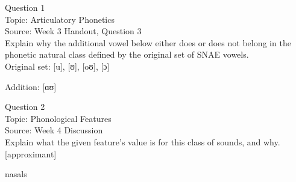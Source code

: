 \documentclass[12pt]{article}
\begin{document}
\begin{center}
\textbf{{\color{violet}{\HUGE 20201104 Wednesday\\}}}

\textbf{{\color{violet}{\HUGE ALL EXAMS\\}}}

\end{center}
\newpage

\begin{center}
\textbf{{\color{blue}{\HUGE START OF EXAM\\}}}

\textbf{{\color{blue}{\HUGE Student ID: 44746\\}}}

\textbf{{\color{blue}{\HUGE 4:00\\}}}

\end{center}
\newpage

{\large Question 1}\\

Topic: Articulatory Phonetics\\
Source: Week 3 Handout, Question 3\\

Explain why the additional vowel below either does or does not belong in the phonetic natural class defined by the original set of SNAE vowels.\\

Original set: {[u]}, {[ʊ]}, {[oʊ]}, {[ɔ]}

Addition: {[ɑʊ]}


\newpage

{\large Question 2}\\

Topic: Phonological Features\\
Source: Week 4 Discussion\\

Explain what the given feature’s value is for this class of sounds, and why.\\

{[approximant]}

nasals


\newpage

\begin{center}
\textbf{{\color{red}{\HUGE END OF EXAM}}}\\

\end{center}
\newpage

\begin{center}
\textbf{{\color{blue}{\HUGE START OF EXAM\\}}}

\textbf{{\color{blue}{\HUGE Student ID: 74752\\}}}

\textbf{{\color{blue}{\HUGE 4:10\\}}}

\end{center}
\newpage
\end{document}
